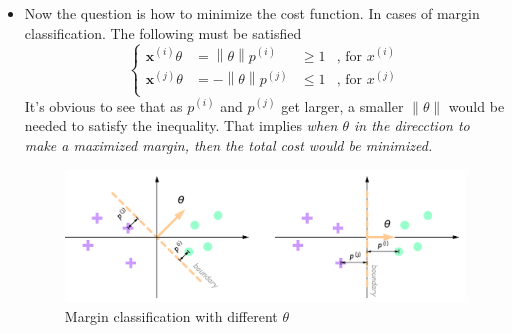 \begin{itemize}
\item Now the question is how to minimize the cost function. In cases of margin classification. The following must be satisfied
\begin{equation}
    \left\{ \begin{aligned}
        \mathbf{x}^{(i)}\theta &= \left\| \theta \right\| p^{(i)} &\geq 1 & \text{, for } x^{(i)}\\
        \mathbf{x}^{(j)}\theta &= -\left\| \theta \right\| p^{(j)} &\leq 1 & \text{, for } x^{(j)}\\
    \end{aligned} \right.
\end{equation}
It's obvious to see that as $p^{(i)}$ and $p^{(j)}$ get larger, a smaller $\| \theta \|$ would be needed to satisfy the inequality.
That implies \emph{when $\theta$ in the direcction to make a maximized margin, then the total cost would be minimized.}
\begin{figure}[!htbp]
    \centering
    \includegraphics[width=4.8in]{./images/marginClassification.png}
    \caption{Margin classification with different $\theta$}
\end{figure}
\end{itemize}


